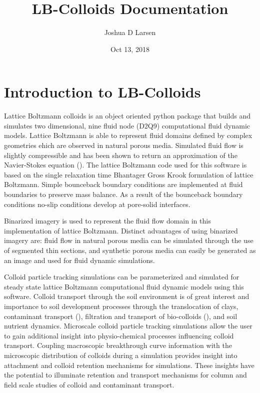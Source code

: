 \documentclass[letterpaper,10pt,english]{sphinxmanual}
\title{LB-Colloids Documentation}
\date{Oct 13, 2018}
\author{Joshua D Larsen}
\begin{document}
\maketitle
\sphinxtableofcontents
{}\label{\detokenize{index::doc}}



\chapter{Introduction to LB-Colloids}
\label{\detokenize{index:welcome-to-the-lb-colloids-documentation}}\label{\detokenize{index:introduction-to-lb-colloids}}
Lattice Boltzmann colloids is an object oriented python package that builds and simulates two dimensional, nine fluid node (D2Q9) computational fluid dynamic models. Lattice Boltzmann is able to represent fluid domains defined by complex geometries ehich are observed in natural porous media. Simulated fluid flow is slightly compressible and has been shown to return an approximation of the Navier-Stokes equation (). The lattice Boltzmann code used for this software is based on the single relaxation time Bhantager Gross Krook formulation of lattice Boltzmann. Simple bounceback boundary conditions are implemented at fluid boundaries to preserve mass balance. As a result of the bounceback boundary conditions no-slip conditions develop at pore-solid interfaces.

Binarized imagery is used to represent the fluid flow domain in this implementation of lattice Boltzmann. Distinct advantages of using binarized imagery are: fluid flow in natural porous media can be simulated through the use of segmented thin sections, and synthetic porous media can easily be generated as an image and used for fluid dynamic simulations.

Colloid particle tracking simulations can be parameterized and simulated for steady state lattice Boltzmann computational fluid dynamic models using this software. Colloid transport through the soil environment is of great interest and importance to soil development processes through the translocation of clays, contaminant transport (), filtration and transport of bio-colloids (), and soil nutrient dynamics. Microscale colloid particle tracking simulations allow the user to gain additional insight into physio-chemical processes influencing colloid transport. Coupling macroscopic breakthrough curve information with the microscopic distribution of colloids during a simulation provides insight into attachment and colloid retention mechanisms for simulations. These insights have the potential to illuminate retention and transport mechanisms for column and field scale studies of colloid and contaminant transport.
\end{document}
